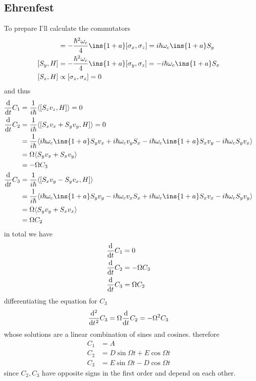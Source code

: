 \subsection{Ehrenfest}
To prepare I'll calculate the commutators
\begin{align}
	[S_x,H] &= -\frac{\hbar^2\omega_c}{4}\ins{1+a}[\sigma_x,\sigma_z] = i\hbar\omega_c\ins{1+a}S_y \\
	[S_y,H] &= -\frac{\hbar^2\omega_c}{4}\ins{1+a}[\sigma_y,\sigma_z] = -i\hbar\omega_c\ins{1+a}S_x \\
	[S_z,H] &\propto [\sigma_z,\sigma_z] = 0
\end{align}
and thus
\begin{align}
	\diff*{C_1}{t} &= \frac{1}{i\hbar}\langle[S_z v_z, H]\rangle = 0 \\
	\diff*{C_2}{t} &= \frac{1}{i\hbar}\langle[S_x v_x + S_y v_y, H]\rangle = 0 \\
	&= \frac{1}{i\hbar}\langle i\hbar\omega_c\ins{1+a}S_y v_x +i\hbar\omega_c v_y S_x - i\hbar\omega_c\ins{1+a}S_x v_y - i\hbar\omega_c S_y v_x \rangle \\
	&= \Omega \langle S_y v_x + S_x v_y \rangle\\
	&= -\Omega C_3 \\
	\diff*{C_3}{t} &= \frac{1}{i\hbar}\langle[S_x v_y - S_y v_x, H]\rangle \\
	&= \frac{1}{i\hbar}\langle i\hbar\omega_c\ins{1+a}S_y v_y - i\hbar\omega_c v_x S_x + i\hbar\omega_c\ins{1+a}S_x v_x - i\hbar\omega_c S_y v_y \rangle \\
	&= \Omega \langle S_y v_y + S_x v_x \rangle\\
	&= \Omega C_2 \\
\end{align}
in total we have
\begin{align}
	\diff*{C_1}{t} &= 0\\
	\diff*{C_2}{t} &= -\Omega C_3\\
	\diff*{C_3}{t} &= \Omega C_2
\end{align}
differentiating the equation for \(C_3\)
\begin{equation}
	\diff*[2]{C_3}{t} = \Omega\diff*{C_2}{t} = -\Omega^2 C_3 
\end{equation}
whose solutions are a linear combination of sines and cosines. therefore
\begin{align}
	C_1 &= A \\
	C_2 &= D\sin\Omega t + E\cos\Omega t \\
	C_3 &= E\sin\Omega t - D\cos\Omega t
\end{align}
since \(C_2, C_3\) have opposite signs in the first order and depend on each other.
